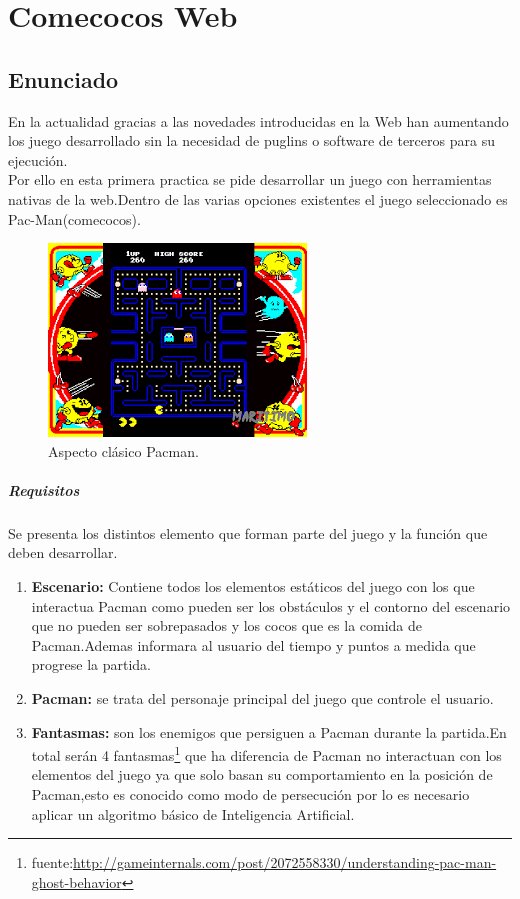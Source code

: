 \chapter{Comecocos Web} %
\section{Enunciado}
En la actualidad gracias a las novedades introducidas en la Web han aumentando los juego desarrollado sin la necesidad de puglins o software de terceros para su ejecución.
\\Por ello en esta primera practica se pide desarrollar un juego con herramientas nativas de la web.Dentro de las varias opciones existentes el juego seleccionado es Pac-Man(comecocos).
\begin{figure}[!h]
\begin{center}
  \includegraphics[width=0.5\linewidth]{Figures/Pacman_Intro}
	\decoRule
	\caption[Aspecto clásico Pacman]{Aspecto clásico Pacman.}
\label{fig:Pacman_Intro}
\end{center}
\end{figure}
\paragraph{Requisitos}
Se presenta los distintos elemento que forman parte del juego y la función que deben desarrollar.
\begin{enumerate}
\item \textbf{Escenario:} Contiene todos los elementos estáticos del juego con los que interactua Pacman como pueden ser los obstáculos y el contorno del escenario que no pueden ser sobrepasados y los cocos que es la comida de Pacman.Ademas informara al usuario del tiempo y puntos a medida que progrese la partida.
\item \textbf{Pacman:} se trata del personaje principal del juego que controle el usuario.
\item \textbf{Fantasmas:} son los enemigos que persiguen a Pacman durante la partida.En total serán 4 fantasmas\footnote{fuente:\url{http://gameinternals.com/post/2072558330/understanding-pac-man-ghost-behavior}} que ha diferencia de Pacman no interactuan con los elementos del juego ya que solo basan su comportamiento en la posición de Pacman,esto es conocido como modo de persecución por lo es necesario aplicar un algoritmo básico de Inteligencia Artificial.
\end{enumerate}
